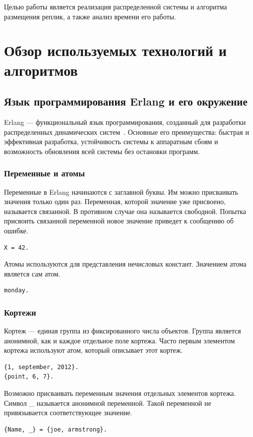	Целью работы является реализация распределенной системы и алгоритма размещения реплик, а также анализ времени его работы.
\newpage

\chapter{Обзор используемых технологий и алгоритмов}
	\section{Язык программирования Erlang и его окружение}
		Erlang --- функциональный язык программирования, созданный для разработки распределенных динамических систем~\cite{erl}.
		Основные его преимущества: быстрая и эффективная разработка, устойчивость системы к аппаратным сбоям и 
		возможность обновления всей системы без остановки программ.

		\subsection{Переменные и атомы} 
			Переменные в Erlang начинаются с заглавной буквы. Им можно присваивать значения только один раз. 
			Переменная, которой значение уже присвоено, называется связанной. В противном случае она называется свободной. 
			Попытка присвоить связанной переменной новое значение приведет к сообщению об ошибке.
			\begin{lstlisting}
X = 42.
			\end{lstlisting}

			Атомы используются для представления нечисловых констант. Значением атома является сам атом.
			\begin{lstlisting}
monday.
			\end{lstlisting}  

		\subsection{Кортежи}
			Кортеж --- единая группа из фиксированного числа объектов. Группа является анонимной, как и каждое отдельное 
			поле кортежа. Часто первым элементом кортежа используют атом, который описывает этот кортеж.
			\begin{lstlisting}
{1, september, 2012}.
{point, 6, 7}.
			\end{lstlisting}
			
			Возможно присваивать переменным значения отдельных элементов кортежа. Символ \_ называется анонимной переменной. 
			Такой переменной не привязывается соответствующее значение.
			\begin{lstlisting}
{Name, _} = {joe, armstrong}.
			\end{lstlisting} 

